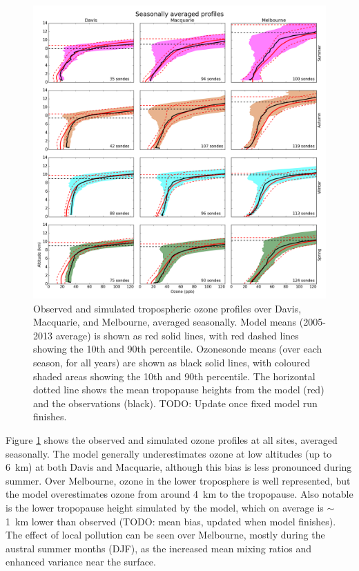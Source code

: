 \documentclass{article}
\begin{document}
  \begin{figure}[!htbp]
    \includegraphics[width=\textwidth]{figures/seasonalprofiles00.png}
    \caption{Observed and simulated tropospheric ozone profiles over Davis, Macquarie, and Melbourne, averaged seasonally.
    Model means (2005-2013 average) is shown as red solid lines, with red dashed lines showing the 10th and 90th percentile.
    Ozonesonde means (over each season, for all years) are shown as black solid lines, with coloured shaded areas showing the 10th and 90th percentile.
    The horizontal dotted line shows the mean tropopause heights from the model (red) and the observations (black).
    TODO: Update once fixed model run finishes.}
    \label{fig:GEOSChemSeasonalProfiles}
  \end{figure}
  
  Figure \ref{fig:GEOSChemSeasonalProfiles} shows the observed and simulated ozone profiles at all sites, averaged seasonally.
  The model generally underestimates ozone at low altitudes (up to 6~km) at both Davis and Macquarie, although this bias is less pronounced during summer.
  Over Melbourne, ozone in the lower troposphere is well represented, but the model overestimates ozone from around 4~km to the tropopause.
  Also notable is the lower tropopause height simulated by the model, which on average is $\sim$ 1~km lower than observed (TODO: mean bias, updated when model finishes).
  The effect of local pollution can be seen over Melbourne, mostly during the austral summer months (DJF), as the increased mean mixing ratios and enhanced variance near the surface.
  
\end{document}
